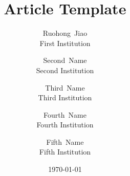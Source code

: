 \title{ Article Template}
\author{%
	{\rm Ruohong~Jiao}\\
	First Institution
	\and
	{\rm Second~Name}\\
	Second Institution
	\and
	{\rm Third~Name}\\
	Third Institution
	\and
	{\rm Fourth~Name}\\
	Fourth Institution
	\and
	{\rm Fifth~Name}\\
	Fifth Institution
}

\date{\today}


\usepackage[labelfont={color=title-color,bf,sf}]{caption}


